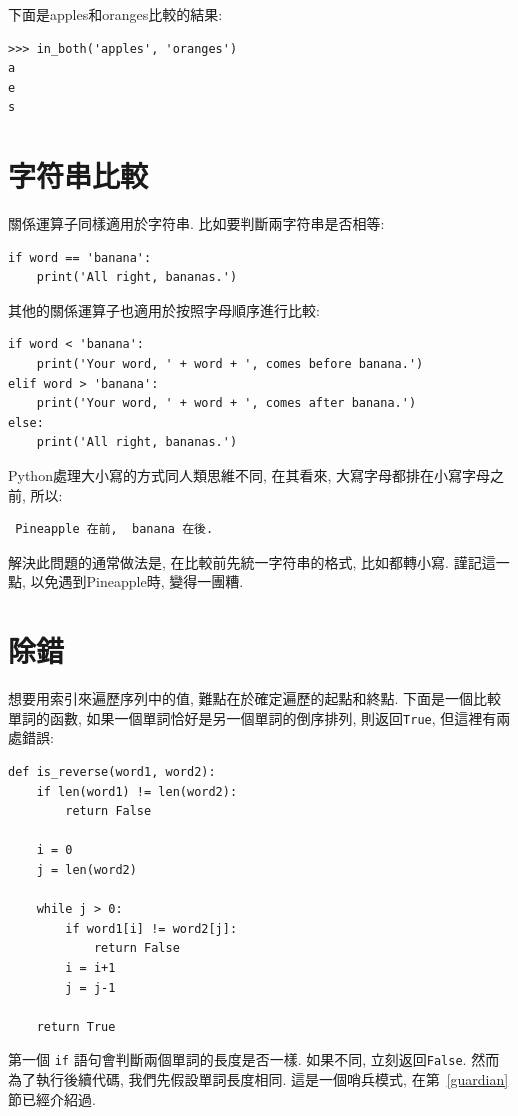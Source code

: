 \documentclass[10pt]{book}
\begin{document}
下面是apples和oranges比較的結果:

\begin{verbatim}
>>> in_both('apples', 'oranges')
a
e
s
\end{verbatim}
%

\section{字符串比較}

關係運算子同樣適用於字符串. 
比如要判斷兩字符串是否相等:

\begin{verbatim}
if word == 'banana':
    print('All right, bananas.')
\end{verbatim}
%

其他的關係運算子也適用於按照字母順序進行比較:

\begin{verbatim}
if word < 'banana':
    print('Your word, ' + word + ', comes before banana.')
elif word > 'banana':
    print('Your word, ' + word + ', comes after banana.')
else:
    print('All right, bananas.')
\end{verbatim}
%
Python處理大小寫的方式同人類思維不同, 在其看來, 大寫字母都排在小寫字母之前, 
所以:

\begin{verbatim}
 Pineapple 在前,  banana 在後.
\end{verbatim}
%
解決此問題的通常做法是, 在比較前先統一字符串的格式, 比如都轉小寫. 
謹記這一點, 以免遇到Pineapple時, 變得一團糟. 


\section{除錯}

想要用索引來遍歷序列中的值, 難點在於確定遍歷的起點和終點. 
下面是一個比較單詞的函數, 如果一個單詞恰好是另一個單詞的倒序排列, 
則返回{\tt True}, 但這裡有兩處錯誤:

\begin{verbatim}
def is_reverse(word1, word2):
    if len(word1) != len(word2):
        return False
    
    i = 0
    j = len(word2)

    while j > 0:
        if word1[i] != word2[j]:
            return False
        i = i+1
        j = j-1

    return True
\end{verbatim}
%
第一個 {\tt if} 語句會判斷兩個單詞的長度是否一樣. 
如果不同, 立刻返回{\tt False}. 
然而為了執行後續代碼, 我們先假設單詞長度相同. 
這是一個哨兵模式, 在第~\ref{guardian}節已經介紹過. 
\end{document}
